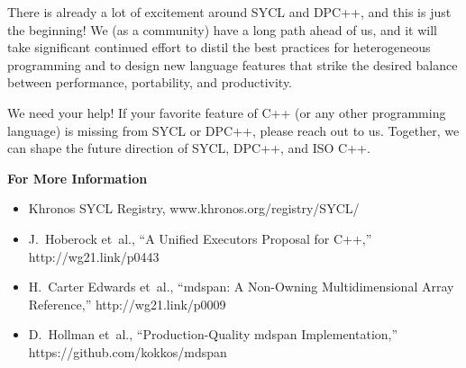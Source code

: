 
There is already a lot of excitement around SYCL and DPC++, and this is just the beginning! We (as a community) have a long path ahead of us, and it will take significant continued effort to distil the best practices for heterogeneous programming and to design new language features that strike the desired balance between performance, portability, and productivity.\par

We need your help! If your favorite feature of C++ (or any other programming language) is missing from SYCL or DPC++, please reach out to us. Together, we can shape the future direction of SYCL, DPC++, and ISO C++.\par

\hspace*{\fill} \par %
\textbf{For More Information}

\begin{itemize}
	\item Khronos SYCL Registry, www.khronos.org/registry/SYCL/
	\item J. Hoberock et al., “A Unified Executors Proposal for C++,” http://wg21.link/p0443
	\item H. Carter Edwards et al., “mdspan: A Non-Owning Multidimensional Array Reference,” http://wg21.link/p0009
	\item D. Hollman et al., “Production-Quality mdspan Implementation,” https://github.com/kokkos/mdspan
\end{itemize}

\newpage